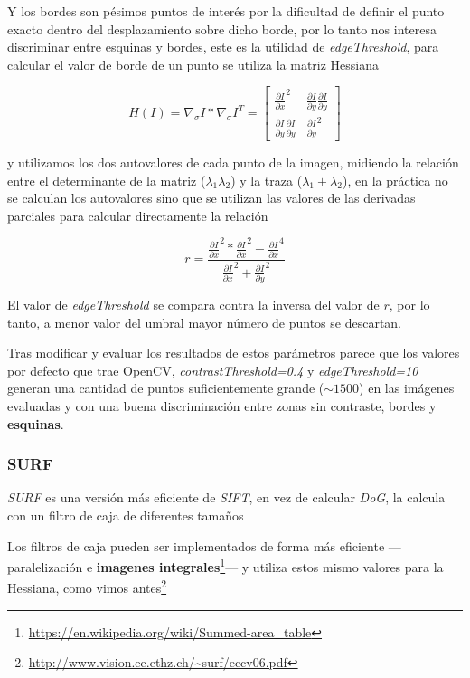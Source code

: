 \documentclass{article}
\newcommand{\img}[2]{
\noindent\makebox[\textwidth][c]{\texttt{[image: \#1]}}%
}
\begin{document}
\img{img/border}{0.1}

Y los bordes son pésimos puntos de interés por la dificultad de definir el punto exacto dentro del desplazamiento sobre dicho borde, por lo tanto nos interesa discriminar entre esquinas y bordes, este es la utilidad de \textit{edgeThreshold}, para calcular el valor de borde de un punto se utiliza la matriz Hessiana

\[ H(I) = \nabla_{\sigma}I * \nabla_{\sigma}I^T = \begin{bmatrix}
\frac{\partial I}{\partial x}^2 & \frac{\partial I}{\partial y} \frac{\partial I}{\partial y}\\ 
\frac{\partial I}{\partial y} \frac{\partial I}{\partial y} & \frac{\partial I}{\partial y}^2 
\end{bmatrix}\]

y utilizamos los dos autovalores de cada punto de la imagen, midiendo la relación entre el determinante de la matriz ($\lambda_1 \lambda_2$) y la traza ($\lambda_1 + \lambda_2$), en la práctica no se calculan los autovalores sino que se utilizan las valores de las derivadas parciales para calcular directamente la relación

\[ r = \frac{\frac{\partial I}{\partial x}^2*\frac{\partial I}{\partial x}^2-\frac{\partial I}{\partial x}^4}{\frac{\partial I}{\partial x}^2+\frac{\partial I}{\partial y}^2}\]

El valor de \textit{edgeThreshold} se compara contra la inversa del valor de $r$, por lo tanto, a menor valor del umbral mayor número de puntos se descartan.

Tras modificar y evaluar los resultados de estos parámetros parece que los valores por defecto que trae OpenCV, \textit{contrastThreshold=0.4} y \textit{edgeThreshold=10} generan  una cantidad de puntos suficientemente grande ($\sim 1500$) en las imágenes evaluadas y con una buena discriminación entre zonas sin contraste, bordes y \textbf{esquinas}.

\subsubsection{SURF}

\textit{SURF} es una versión más eficiente de \textit{SIFT}, en vez de calcular \textit{DoG}, la calcula con un filtro de caja de diferentes tamaños 
\\

\img{img/surf_box}{0.2}

Los filtros de caja pueden ser implementados de forma más eficiente ---paralelización e \textbf{imagenes integrales}\footnote{\url{https://en.wikipedia.org/wiki/Summed-area_table}}--- y utiliza estos mismo valores para la Hessiana, como vimos antes\footnote{\url{http://www.vision.ee.ethz.ch/~surf/eccv06.pdf}}
\end{document}
